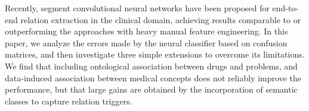 Recently, segment convolutional neural networks have been proposed for end-to-end relation extraction in the clinical domain, achieving results comparable to or outperforming the approaches with heavy manual feature engineering. In this paper, we analyze the errors made by the neural classifier based on confusion matrices, and then investigate three simple extensions to overcome its limitations. We find that including ontological association between drugs and problems, and data-induced association between medical concepts does not reliably improve the performance, but that large gains are obtained by the incorporation of semantic classes to capture relation triggers.
